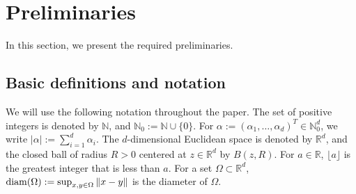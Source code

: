 \documentclass[11pt]{article}
\theoremstyle{remark}
\theoremstyle{example}
\theoremstyle{remark}
\newcommand{\N}{\mathbb{N}}
\newcommand{\R}{\mathbb{R}}
\newcommand{\blue}{\textcolor{blue}}
\newcommand{\citep}{\cite}
\begin{document}
\begin{comment}
\paragraph{Kernel mean embedding.}
Kernel quadrature is closely related to {\em kernel mean embeddings} \citep{SmoGreSonSch07,song2009,SriGreFukSchetal10,GreBorRasSchetal12,FukSonGre13,SonFukGre13,MuaFukSriSch17}.
Our results provide convergence guarantees for integral estimation needed in recovering distributions from mean embeddings (\blue{Needs more explanation. }).
This topic has been discussed by two of the current authors, focusing on the situations where the RKHS is that of a Gaussian kernel and sample points are random \citep{KanFuk14}.\footnote{However, we need to point out that there is a crucial flaw in the proof of the main result of this paper \cite[Theorem 1]{KanFuk14}. Therefore the results in this previous paper are no longer valid.}
On the other hand, our results provide convergence guarantees for situations where the RKHS is a Sobolev space and sample points are deterministic.
\end{comment}















\section{Preliminaries}\label{sec:definition}
In this section, we present the required preliminaries. 
\subsection{Basic definitions and notation}
We will use the following notation throughout the paper. 
The set of positive integers is denoted by $\N$, and $\mathbb{N}_0 := \N \cup \{ 0 \}$. For $\alpha := (\alpha_1,\dots,\alpha_d)^T \in \N_0^d$, we write $| \alpha | := \sum_{i=1}^d \alpha_i$.
The $d$-dimensional Euclidean space is denoted by $\R^d$, and the closed ball of radius $R>0$ centered at $z\in\R^d$ by $B(z,R)$.  
For $a \in \R$, $\lfloor a \rfloor$ is the greatest integer that is less than $a$. 
For a set $\Omega \subset \R^d$, ${\rm diam} (\Omega) := \sup_{x, y \in \Omega} \| x - y\|$ is the diameter of $\Omega$.
\end{document}
